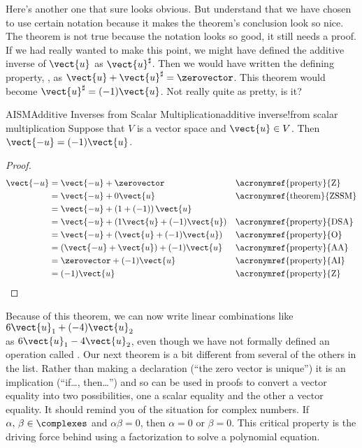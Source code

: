 %
Here's another one that sure looks obvious.  But understand that we have chosen to use certain notation because it makes the theorem's conclusion look so nice.  The theorem is not true because the notation looks so good, it still needs a proof.  If we had really wanted to make this point, we might have defined the additive inverse of $\vect{u}$ as $\vect{u}^\sharp$.  Then we would have written the defining property, , as $\vect{u}+\vect{u}^\sharp=\zerovector$.  This theorem would become $\vect{u}^\sharp=(-1)\vect{u}$.  Not really quite as pretty, is it?
%
\begin{theorem}{AISM}{Additive Inverses from Scalar Multiplication}{additive inverse!from scalar multiplication}
%
Suppose that $V$ is a vector space and $\vect{u}\in V$.  Then $\vect{-u}=(-1)\vect{u}$.
\end{theorem}
%
\begin{proof}
%
\begin{align*}
\vect{-u}
&=\vect{-u}+\zerovector&&\text{\acronymref{property}{Z}}\\
&=\vect{-u}+0\vect{u}&&\text{\acronymref{theorem}{ZSSM}}\\
&=\vect{-u}+\left(1+(-1)\right)\vect{u}\\
&=\vect{-u}+\left(1\vect{u}+(-1)\vect{u}\right)&&\text{\acronymref{property}{DSA}}\\
&=\vect{-u}+\left(\vect{u}+(-1)\vect{u}\right)&&\text{\acronymref{property}{O}}\\
&=\left(\vect{-u}+\vect{u}\right)+(-1)\vect{u}&&\text{\acronymref{property}{AA}}\\
&=\zerovector+(-1)\vect{u}&&\text{\acronymref{property}{AI}}\\
&=(-1)\vect{u}&&\text{\acronymref{property}{Z}}
%
\end{align*}
%
\end{proof}
%
Because of this theorem, we can now write linear combinations like $6\vect{u}_1+(-4)\vect{u}_2$\\
as $6\vect{u}_1-4\vect{u}_2$, even though we have not formally defined an operation called .
%
Our next theorem is a bit different from several of the others in the list.  Rather than making a declaration (``the zero vector is unique'') it is an implication (``if\dots, then\dots'') and so can be used in proofs to convert a vector equality into two possibilities, one a scalar equality and the other a vector equality.  It should remind you of the situation for complex numbers.  If $\alpha,\,\beta\in\complexes$ and $\alpha\beta=0$, then $\alpha=0$ or $\beta=0$.  This critical property is the driving force behind using a factorization to solve a polynomial equation.
